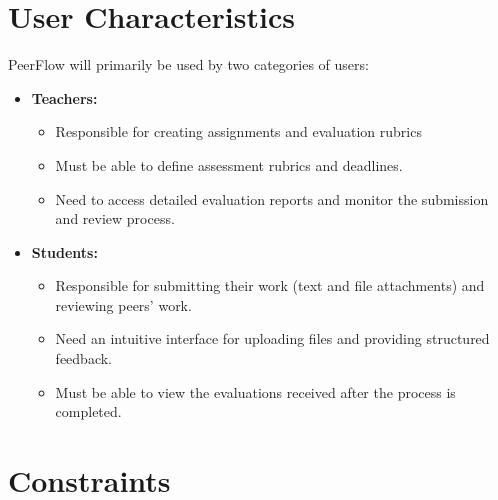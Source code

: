 \section{User Characteristics}

\begin{justify}
    PeerFlow will primarily be used by two categories of users:
    \begin{itemize}
    \item \textbf{Teachers:}
    \begin{itemize}
        \item Responsible for creating assignments and evaluation rubrics%
        \item Must be able to define assessment rubrics and deadlines.
        \item Need to access detailed evaluation reports and monitor the submission and review process.
    \end{itemize}
    \item \textbf{Students:}
    \begin{itemize}
        \item Responsible for submitting their work (text and file attachments) and reviewing peers' work.
        \item Need an intuitive interface for uploading files and providing structured feedback.
        \item Must be able to view the evaluations received after the process is completed.
    \end{itemize}
\end{itemize}
\end{justify}

\section{Constraints}

